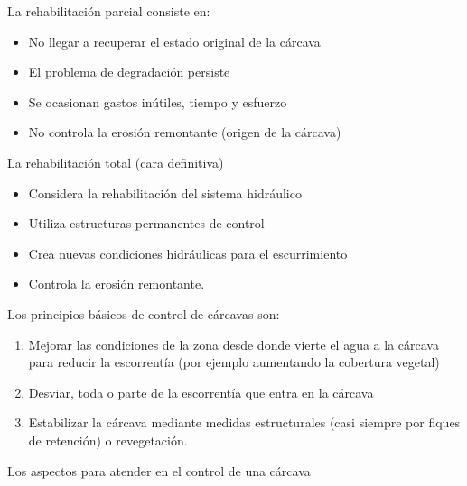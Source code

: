     La rehabilitación parcial consiste en:
    \begin{itemize}
        \item No llegar a recuperar el estado original de la cárcava
        \item El problema de degradación persiste
        \item Se ocasionan gastos inútiles, tiempo y esfuerzo
        \item No controla la erosión remontante (origen de la cárcava)
    \end{itemize}
    La rehabilitación total (cara definitiva)
    \begin{itemize}
        \item Considera la rehabilitación del sistema hidráulico
        \item Utiliza estructuras permanentes de control
        \item Crea nuevas condiciones hidráulicas para el escurrimiento
        \item Controla la erosión remontante.
    \end{itemize}
    Los principios básicos de control de cárcavas son:
    \begin{enumerate}
        \item Mejorar las condiciones de la zona desde donde vierte el agua a la cárcava para reducir la escorrentía (por ejemplo aumentando la cobertura vegetal)
        \item Desviar, toda o parte de la escorrentía que entra en la cárcava
        \item Estabilizar la cárcava mediante medidas estructurales (casi siempre por fiques de retención) o revegetación.
    \end{enumerate}
    Los aspectos para atender en el control de una cárcava
